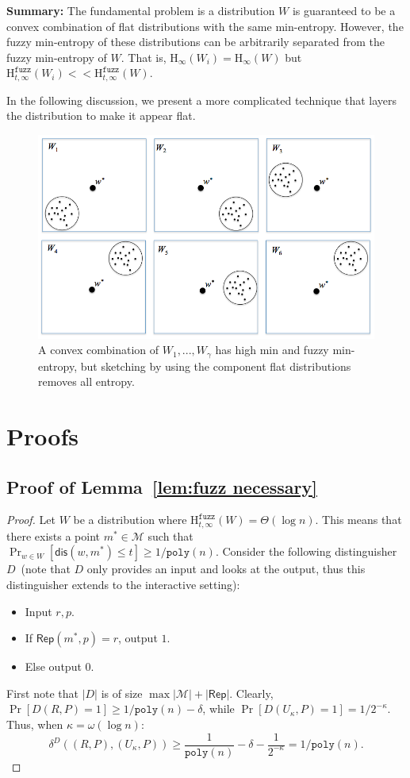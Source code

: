 \documentclass[11pt]{article}
\newcommand{\lemref}[1]{\mbox{Lemma~\ref{#1}}}
\newcommand{\class}[1]{{\ensuremath{\mathsf{#1}}}}
\newcommand{\rep}{\ensuremath{\class{Rep}}\xspace}
\newcommand{\dis}{\ensuremath{\mathsf{dis}}}
\newcommand{\poly}{\ensuremath{\mathtt{poly}}\xspace}
\newcommand{\Hoo}{\mathrm{H}_\infty}
\newcommand{\Hfuzz}{\mathrm{H}^{\mathtt{fuzz}}_{t,\infty}}
\begin{document}
\textbf{Summary:} The fundamental problem is a distribution $W$ is guaranteed to be a convex combination of flat distributions with the same min-entropy.  However, the fuzzy min-entropy of these distributions can be arbitrarily separated from the fuzzy min-entropy of $W$.  That is, $\Hoo(W_i) = \Hoo(W)$ but $\Hfuzz(W_i) << \Hfuzz(W)$.

In the following discussion, we present a more complicated technique that layers the distribution to make it appear flat.

\begin{figure}[t]

\centering
    \includegraphics[width=.9\textwidth]{convexCombExample.png}
    \caption{A convex combination of $W_1,..., W_\gamma$ has high min and fuzzy min-entropy, but sketching by using the component flat distributions removes all entropy.}
\label{fig:convex comb}    
\end{figure}

\section{Proofs}
\subsection{Proof of \lemref{lem:fuzz necessary}}
\label{sec:proof fuzz necessary}
\begin{proof}
Let $W$ be a distribution where $\Hfuzz(W) = \Theta(\log n)$.  This means that there exists a point $m^*\in \mathcal{M}$ such that $\Pr_{w\in W}[\dis (w, m^*)\leq t] \geq 1/\poly(n)$.  Consider the following distinguisher $D$~(note that $D$ only provides an input and looks at the output, thus this distinguisher extends to the interactive setting):
\begin{itemize}
\item Input $r, p$.
\item If $\rep(m^*, p) = r$, output $1$.
\item Else output $0$.
\end{itemize}
First note that $|D|$ is of size $\max |\mathcal{M}|+ |\rep|$.  Clearly, $\Pr[D(R, P) = 1]\geq 1/\poly(n) - \delta$, while $\Pr[D(U_\kappa, P)=1 ]= 1/2^{-\kappa}$.  Thus, when $\kappa = \omega(\log n)$:
\[
\delta^D((R, P), (U_\kappa, P))\geq \frac{1}{\poly(n)} -\delta -  \frac{1}{2^{-\kappa}} = 1/\poly(n).
\]
\end{proof}
\end{document}
